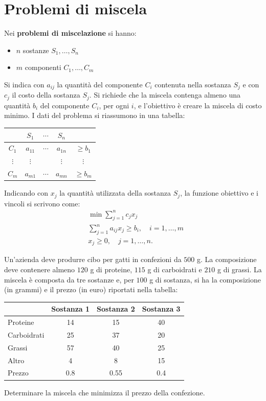 \section{Problemi di miscela}\label{sec:es-miscela}
Nei \textbf{problemi di miscelazione} si hanno:
\begin{itemize}
  \item $n$ sostanze $S_1, \dots, S_n$
  \item $m$ componenti $C_1, \dots, C_m$
\end{itemize}
Si indica con $a_{ij}$ la quantità del componente $C_i$ contenuta nella sostanza $S_j$ e con $c_j$ il costo della sostanza $S_j$. Si richiede che la miscela contenga almeno una quantità $b_i$ del componente $C_i$, per ogni $i$, e l'obiettivo è creare la miscela di costo minimo. I dati del problema si riassumono in una tabella:
\begin{center}
\begin{tabular}{c|ccc|c}
 & $S_1$ & $\cdots$ & $S_n$ & \\
\hline
$C_1$ & $a_{11}$ & $\cdots$ & $a_{1n}$ & $\ge b_1$ \\
$\vdots$ & $\vdots$ & & $\vdots$ & $\vdots$ \\
$C_m$ & $a_{m1}$ & $\cdots$ & $a_{mn}$ & $\ge b_m$ \\
\end{tabular}
\end{center}
Indicando con $x_j$ la quantità utilizzata della sostanza $S_j$, la funzione obiettivo e i vincoli si scrivono come:
\[
\begin{aligned}
&\min \sum_{j=1}^{n} c_j x_j \\
&\sum_{j=1}^{n} a_{ij} x_j \ge b_i, \quad i = 1, \dots, m \\
&x_j \ge 0, \quad j = 1, \dots, n.
\end{aligned}
\]

\begin{esercizio}
Un'azienda deve produrre cibo per gatti in confezioni da $500$ g. La composizione deve contenere almeno $120$ g di proteine, $115$ g di carboidrati e $210$ g di grassi. La miscela è composta da tre sostanze e, per $100$ g di sostanza, si ha la composizione (in grammi) e il prezzo (in euro) riportati nella tabella:
\begin{center}
\begin{tabular}{lccc}
\toprule
 & Sostanza 1 & Sostanza 2 & Sostanza 3 \\
\midrule
Proteine     & 14 & 15 & 40 \\
Carboidrati  & 25 & 37 & 20 \\
Grassi       & 57 & 40 & 25 \\
Altro        & 4 & 8 & 15 \\
Prezzo       & 0.8 & 0.55 & 0.4 \\
\bottomrule
\end{tabular}
\end{center}
Determinare la miscela che minimizza il prezzo della confezione.
\end{esercizio}

